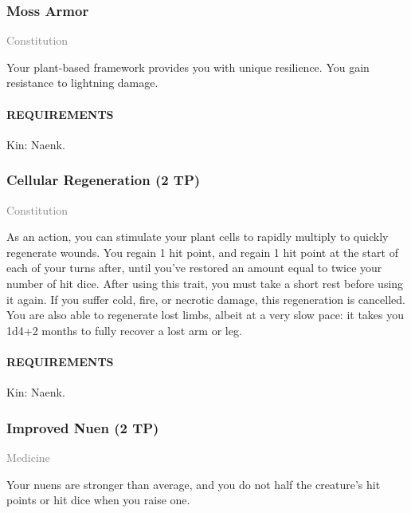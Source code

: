     \subsubsection{Moss Armor} \label{feat::mossarmor}
    \small{\textcolor{gray}{Constitution}}

    \normalsize
    Your plant-based framework provides you with unique resilience.
    You gain resistance to lightning damage.
    \paragraph{REQUIREMENTS} Kin: Naenk.

    \subsubsection{Cellular Regeneration (2 TP)} \label{feat::cellularregeneration}
    \small{\textcolor{gray}{Constitution}}

    \normalsize
    As an action, you can stimulate your plant cells to rapidly multiply to quickly regenerate wounds.
    You regain 1 hit point, and regain 1 hit point at the start of each of your turns after, until you've restored an amount equal to twice your number of hit dice.
    After using this trait, you must take a short rest before using it again.
    If you suffer cold, fire, or necrotic damage, this regeneration is cancelled.
    You are also able to regenerate lost limbs, albeit at a very slow pace: it takes you 1d4+2 months to fully recover a lost arm or leg.
    \paragraph{REQUIREMENTS} Kin: Naenk.

    \subsubsection{Improved Nuen (2 TP)} \label{feat::improvednuen}
    \small{\textcolor{gray}{Medicine}}

    \normalsize
    Your nuens are stronger than average, and you do not half the creature's hit points or hit dice when you raise one.

